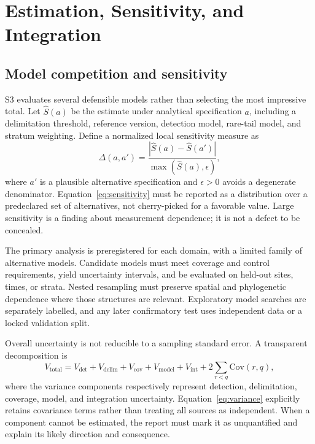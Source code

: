 \documentclass[conference]{IEEEtran}
\begin{document}
\section{Estimation, Sensitivity, and Integration}

\subsection{Model competition and sensitivity}

S3 evaluates several defensible models rather than selecting the most impressive total. Let $\widehat{S}(a)$ be the estimate under analytical specification $a$, including a delimitation threshold, reference version, detection model, rare-tail model, and stratum weighting. Define a normalized local sensitivity measure as
\begin{equation}
\Delta(a,a')=\frac{\left|\widehat{S}(a)-\widehat{S}(a')\right|}{\max\left(\widehat{S}(a),\epsilon\right)},
\label{eq:sensitivity}
\end{equation}
where $a'$ is a plausible alternative specification and $\epsilon>0$ avoids a degenerate denominator. Equation~\eqref{eq:sensitivity} must be reported as a distribution over a predeclared set of alternatives, not cherry-picked for a favorable value. Large sensitivity is a finding about measurement dependence; it is not a defect to be concealed.

The primary analysis is preregistered for each domain, with a limited family of alternative models. Candidate models must meet coverage and control requirements, yield uncertainty intervals, and be evaluated on held-out sites, times, or strata. Nested resampling must preserve spatial and phylogenetic dependence where those structures are relevant. Exploratory model searches are separately labelled, and any later confirmatory test uses independent data or a locked validation split.

Overall uncertainty is not reducible to a sampling standard error. A transparent decomposition is
\begin{equation}
V_{\mathrm{total}}=V_{\mathrm{det}}+V_{\mathrm{delim}}+V_{\mathrm{cov}}+V_{\mathrm{model}}+V_{\mathrm{int}}+2\sum_{r<q}\mathrm{Cov}(r,q),
\label{eq:variance}
\end{equation}
where the variance components respectively represent detection, delimitation, coverage, model, and integration uncertainty. Equation~\eqref{eq:variance} explicitly retains covariance terms rather than treating all sources as independent. When a component cannot be estimated, the report must mark it as unquantified and explain its likely direction and consequence.
\end{document}
